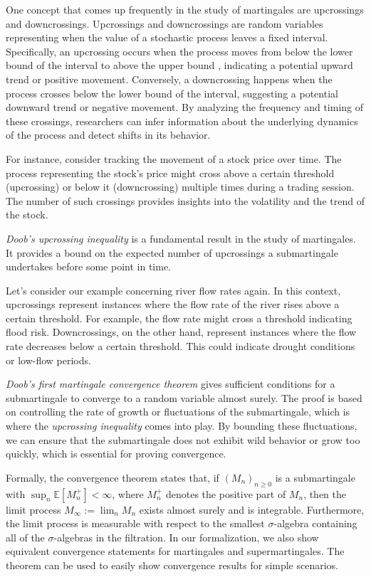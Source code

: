 \documentclass[11pt,a4paper]{article}
\begin{document}
One concept that comes up frequently in the study of martingales are upcrossings and downcrossings. Upcrossings and downcrossings are random variables representing when the value of a stochastic process leaves a fixed interval. Specifically, an upcrossing occurs when the process moves from below the lower bound of the interval to above the upper bound \cite{Grimmett_Stirzaker_2020}, indicating a potential upward trend or positive movement. Conversely, a downcrossing happens when the process crosses below the lower bound of the interval, suggesting a potential downward trend or negative movement. By analyzing the frequency and timing of these crossings, researchers can infer information about the underlying dynamics of the process and detect shifts in its behavior.

For instance, consider tracking the movement of a stock price over time. The process representing the stock's price might cross above a certain threshold (upcrossing) or below it (downcrossing) multiple times during a trading session. The number of such crossings provides insights into the volatility and the trend of the stock. 

\textit{Doob's upcrossing inequality} is a fundamental result in the study of martingales. It provides a bound on the expected number of upcrossings a submartingale undertakes before some point in time.

Let's consider our example concerning river flow rates again. In this context, upcrossings represent instances where the flow rate of the river rises above a certain threshold. For example, the flow rate might cross a threshold indicating flood risk. Downcrossings, on the other hand, represent instances where the flow rate decreases below a certain threshold. This could indicate drought conditions or low-flow periods.

\textit{Doob's first martingale convergence theorem} gives sufficient conditions for a submartingale to converge to a random variable almost surely. The proof is based on controlling the rate of growth or fluctuations of the submartingale, which is where the \textit{upcrossing inequality} comes into play. By bounding these fluctuations, we can ensure that the submartingale does not exhibit wild behavior or grow too quickly, which is essential for proving convergence. 

Formally, the convergence theorem states that, if $(M_n)_{n \ge 0}$ is a submartingale with $\sup_n \mathbb{E}[M^{+}_n] < \infty$, where $M^{+}_n$ denotes the positive part of $M_n$, then the limit process $M_\infty := \lim_n M_n$ exists almost surely and is integrable. Furthermore, the limit process is measurable with respect to the smallest $\sigma$-algebra containing all of the $\sigma$-algebras in the filtration. In our formalization, we also show equivalent convergence statements for martingales and supermartingales. The theorem can be used to easily show convergence results for simple scenarios. 
\end{document}
